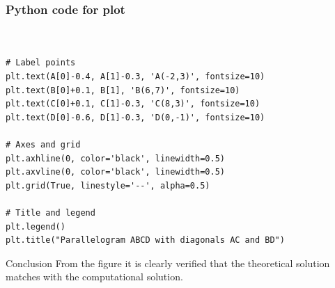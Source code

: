 \documentclass{beamer}
\begin{document}
\begin{frame}[fragile]
\frametitle{Python code for plot}
\begin{lstlisting}


# Label points
plt.text(A[0]-0.4, A[1]-0.3, 'A(-2,3)', fontsize=10)
plt.text(B[0]+0.1, B[1], 'B(6,7)', fontsize=10)
plt.text(C[0]+0.1, C[1]-0.3, 'C(8,3)', fontsize=10)
plt.text(D[0]-0.6, D[1]-0.3, 'D(0,-1)', fontsize=10)

# Axes and grid
plt.axhline(0, color='black', linewidth=0.5)
plt.axvline(0, color='black', linewidth=0.5)
plt.grid(True, linestyle='--', alpha=0.5)

# Title and legend
plt.legend()
plt.title("Parallelogram ABCD with diagonals AC and BD")

\end{lstlisting}
\end{frame}

\begin{frame}{Conclusion}
From the figure it is clearly verified that the theoretical solution matches with the computational solution.
\end{frame}
\end{document}
